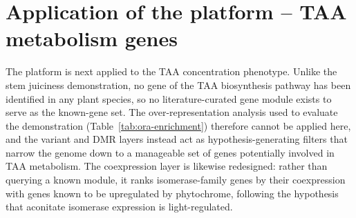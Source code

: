 
\section{Application of the platform -- TAA metabolism genes}
\hspace{1em}The platform is next applied to the TAA concentration phenotype. Unlike the stem juiciness demonstration, no gene of the TAA biosynthesis pathway has been identified in any plant species, so no literature-curated gene module exists to serve as the known-gene set. The over-representation analysis used to evaluate the demonstration (Table~\ref{tab:ora-enrichment}) therefore cannot be applied here, and the variant and DMR layers instead act as hypothesis-generating filters that narrow the genome down to a manageable set of genes potentially involved in TAA metabolism. The coexpression layer is likewise redesigned: rather than querying a known module, it ranks isomerase-family genes by their coexpression with genes known to be upregulated by phytochrome, following the hypothesis that aconitate isomerase expression is light-regulated.

